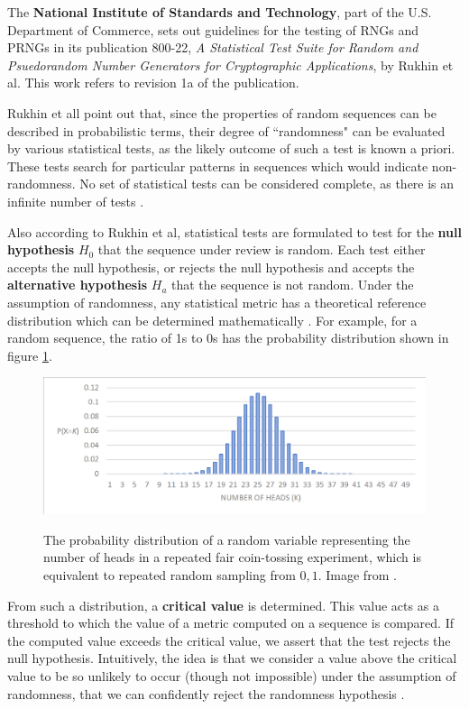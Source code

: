 \documentclass[12pt, titlepage]{report}
\theoremstyle{definition}
\begin{document}
The \textbf{National Institute of Standards and Technology}, part of the U.S. Department of Commerce, sets out guidelines for the testing of RNGs and PRNGs in its publication 800-22, \textit{A Statistical Test Suite for Random and Psuedorandom Number Generators for Cryptographic Applications}, by Rukhin et al. This work refers to revision 1a of the publication.

Rukhin et all point out that, since the properties of random sequences can be described in probabilistic terms, their degree of ``randomness" can be evaluated by various statistical tests, as the likely outcome of such a test is known a priori. These tests search for particular patterns in sequences which would indicate non-randomness. No set of statistical tests can be considered complete, as there is an infinite number of tests \cite[p. 1-2]{rukhin2001statistical}.

Also according to Rukhin et al, statistical tests are formulated to test for the \textbf{null hypothesis} $H_0$ that the sequence under review is random. Each test either accepts the null hypothesis, or rejects the null hypothesis and accepts the \textbf{alternative hypothesis} $H_a$ that the sequence is not random. Under the assumption of randomness, any statistical metric has a theoretical reference distribution which can be determined mathematically \cite[p. 1.3]{rukhin2001statistical}. For example, for a random sequence, the ratio of 1s to 0s has the probability distribution shown in figure \ref{figure:distribution}.

\begin{figure}
\centering
\includegraphics[width=1\textwidth]{img/distribution.png}\\
\caption{The probability distribution of a random variable representing the number of heads in a repeated fair coin-tossing experiment, which is equivalent to repeated random sampling from ${0, 1}$. Image from \cite{terr2009math}.}
\label{figure:distribution}
\end{figure}
	
From such a distribution, a \textbf{critical value} is determined. This value acts as a threshold to which the value of a metric computed on a sequence is compared. If the computed value exceeds the critical value, we assert that the test rejects the null hypothesis. Intuitively, the idea is that we consider a value above the critical value to be so unlikely to occur (though not impossible) under the assumption of randomness, that we can confidently reject the randomness hypothesis \cite[p. 1.3]{rukhin2001statistical}.
\end{document}
